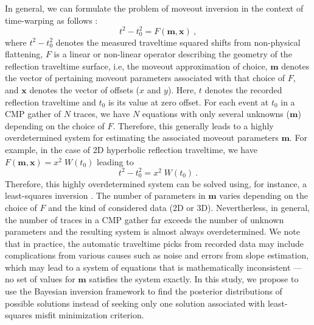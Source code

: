 In general, we can formulate the problem of moveout inversion in the context of time-warping as follows \cite[]{will}:
\begin{equation}
\label{eq:general}
    t^2-t^2_0 = F(\mathbf{m},\mathbf{x})~,
\end{equation}
where $t^2-t^2_0$ denotes the measured traveltime squared shifts from non-physical flattening, $F$ is a linear or non-linear operator describing the geometry of the reflection traveltime surface, i.e, the moveout approximation of choice, $\mathbf{m}$ denotes the vector of pertaining moveout parameters associated with that choice of $F$, and  $\mathbf{x}$ denotes the vector of offsets ($x$ and $y$). Here, $t$ denotes the recorded reflection traveltime and $t_0$ is its value at zero offset. For each event at $t_0$ in a CMP gather of $N$ traces, we have $N$ equations with only several unknowns ($\mathbf{m}$) depending on the choice of $F$. Therefore, this generally leads to a highly overdetermined system for estimating the associated moveout parameters $\mathbf{m}$. For example, in the case of 2D hyperbolic reflection traveltime, we have $F(\mathbf{m},\mathbf{x}) = x^2\;W(t_0)$ leading to
\begin{equation}
    t^2-t^2_0 = x^2\;W(t_0)~.
\end{equation}
Therefore, this highly overdetermined system can be solved using, for instance, a least-squares inversion \cite[]{will,willthesis}. The number of parameters in $\mathbf{m}$ varies depending on the choice of $F$ and the kind of considered data (2D or 3D). Nevertherless, in general, the number of traces in a CMP gather far exceeds the number of unknown parameters and the resulting system is almost always overdetermined. We note that in practice, the automatic traveltime picks from recorded data may include complications from various causes such as noise and errors from slope estimation, which may lead to a system of equations that is mathematically inconsistent --- no set of values for $\mathbf{m}$ satisfies the system exactly. In this study, we propose to use the Bayesian inversion framework to find the posterior distributions of possible solutions instead of seeking only one solution associated with least-squares misfit minimization criterion.


